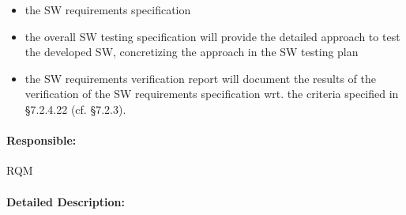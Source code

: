 \begin{itemize}
\item the SW requirements specification
\item the overall SW testing specification will provide the detailed approach
to test the developed SW, concretizing the approach in the SW testing plan
\item the SW requirements verification report will document the results
of the verification of the SW requirements specification wrt. the criteria
specified in §7.2.4.22 (cf. §7.2.3).
\end{itemize} 

\paragraph{Responsible:}
\label{sec:sw-req-responsible}
RQM

\paragraph{Detailed Description:}
\label{sec:sw-req-deta-descr}

\tbc

%
%
%
%
%
%



